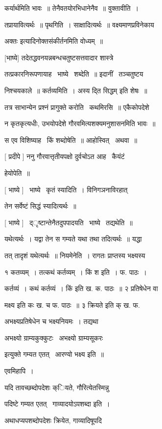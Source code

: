\documentclass[11pt, openany]{book}
\begin{document}
कर्यार्थमिति भावः~॥ तेनैवतयोरभिधानेनैव~॥ वुक्तावीति~। 

तप्रायावित्यर्थः~॥ पृथगिति~। साक्षादित्यर्थः~॥ वक्ष्यमाणप्रविनेकाय 

अक्तः इत्यादिनोक्तसंकीर्तनमिति वोध्यम्~॥ 

[भाष्ये] तदेतद्धवनयन्नबन्धचतुष्टसत्तवादार शास्त्रे 

तत्प्रकारनिरूपणायाह \textendash\ भाष्ये \textendash\ शब्देति~॥ इदानीं \textendash\ तञ्चतुष्टय \textendash\ 

निश्चयकाले~॥ कर्तव्यमिति~। अस्य {\qt द्ति सिद्धम्} इति शेषः~॥ 

तत्र साभान्येन प्रश्नं प्रागुक्ते करोति \textendash\ कथमिरसि~॥ एकैकोपदेशे 

न कृतकृत्यधीः, उभयोपदेशे गौरवमित्यशक्यमनुशासनमिति भावः~॥ 

स एव विशिष्याह \textendash\ किं शब्दोषेति~॥ आहोस्वित् \textendash\ अथवा~॥ 

[ प्रदीपे ] ननु गौरवात्तृतीयपक्षो दुर्वचोऽत आह \textendash\ कैयंटं \textendash\ 

हेयोपेति~॥ 

[ भाष्ये ] \textendash\ भाष्ये \textendash\ कृतं स्यादिति~। विनिगञनाविरहात् 

तेन सर्वेष्टं सिद्धं स्यादित्यर्थः~॥ 

[ भाष्ये ] \textendash\ द्ृष्टान्तेनैतदुपपादयति \textendash\ भाष्ये \textendash\ तद्यथेति~॥ 

यथेत्यर्थः~। यद्वा तेन स गम्यते यथा तथा तदित्यर्थः~॥ यद्धा 

तत् तादृशं यथेत्यर्थः~॥ नियमेनेति~। रागतः प्राप्तस्य भक्ष्यस्य 

१ {\qt कतव्यम्~। तत्कथं कर्तव्यम्~। किं श} इति~। फ. पाठः~। 

{\qt कर्तव्यं~। कथं कर्तव्यं~। किं इति ख. क. पाठः~॥ २ }प्रतिषेधेन वा 

मक्ष्य इति कः ख. च फ. पाठः~॥ ३ {\qt क्रियते} इति क् ख. फ. 

अभक्ष्यप्रतिषेधेन च भक्ष्यनियमः~। तद्यथा \textendash\ 

{\qt अभक्ष्यो ग्राम्यकुक्कुटः \textendash\ अभक्ष्यो ग्राम्यसूकरः} 

इत्युक्ते गम्यत एतत् \textendash\ आरण्यो भक्ष्य इति~॥ 

एवमिहापि~। 

यदि तावच्छब्दोपदेशः क्ियते, गौरित्येतस्मिन्नु \textendash\ 

पदिष्टे गम्यत एतत् \textendash\ गाव्यादयोऽपशब्दा इति~। 

अथाधप्यपशब्दोपदेशः क्रियेत, गाव्यादिषूपदि \textendash\ 
\end{document}
